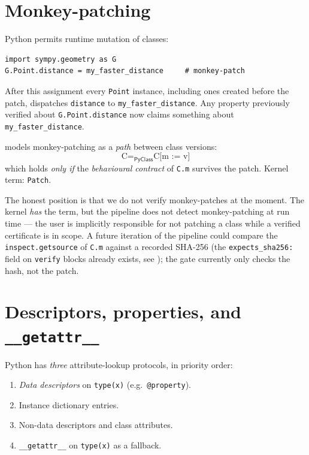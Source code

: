 \section{Monkey-patching}
\label{sec:monkey}

Python permits runtime mutation of classes:
\begin{lstlisting}[language=psdl]
import sympy.geometry as G
G.Point.distance = my_faster_distance     # monkey-patch
\end{lstlisting}

After this assignment every \texttt{Point} instance, including ones
created before the patch, dispatches \verb|distance| to
\verb|my_faster_distance|.  Any property previously verified about
\verb|G.Point.distance| now claims something about
\verb|my_faster_distance|.

\Deppy{} models monkey-patching as a \emph{path} between class
versions:
\begin{equation*}
  \text{C} =_{\mathsf{PyClass}} \text{C[m := v]}
\end{equation*}
which holds \emph{only if} the \emph{behavioural contract} of
\texttt{C.m} survives the patch.  Kernel term: \texttt{Patch}.

The honest position is that we do not verify monkey-patches at the
moment.  The kernel \emph{has} the term, but the pipeline does not
detect monkey-patching at run time --- the user is implicitly
responsible for not patching a class while a verified certificate is
in scope.  A future iteration of the pipeline could compare the
\verb|inspect.getsource| of \verb|C.m| against a recorded SHA-256
(the \verb|expects_sha256:| field on \verb|verify| blocks already
exists, see ); the gate currently only checks the
hash, not the patch.

\section{Descriptors, properties, and \texttt{\_\_getattr\_\_}}
\label{sec:descriptors}

Python has \emph{three} attribute-lookup protocols, in priority order:
\begin{enumerate}[leftmargin=1.7em]
  \item \emph{Data descriptors} on \verb|type(x)|
    (e.g.\ \verb|@property|).
  \item Instance dictionary entries.
  \item Non-data descriptors and class attributes.
  \item \verb|__getattr__| on \verb|type(x)| as a fallback.
\end{enumerate}


